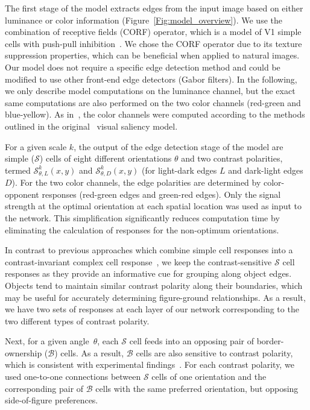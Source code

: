 The first stage of the model
extracts edges from the input image
based on either luminance or color information (Figure~\ref{Fig:model_overview}).
 We use the combination of receptive fields (CORF) operator, which is a
model of V1 simple cells with push-pull
inhibition~\citep{Azzopardi_etal14}. We chose the CORF operator due to its texture suppression properties, which can be beneficial
when applied to natural images. Our model does not require a specific edge detection method and could be modified to use other front-end edge detectors (\eg Gabor filters).
In the following, we only describe model computations on the luminance channel, but the exact same computations are also performed on the two color channels (\ie red-green and blue-yellow). As in~\citet{Russell_etal14}, the color channels were computed according to the methods outlined in the original~\citet{Itti_etal98a} visual saliency model.

For a given scale $k$, the output of the edge detection stage of the model are simple ($\mathcal{S}$) cells of eight different orientations $\theta$ and two contrast polarities, termed $\mathcal{S}^k_{\theta,L}(x,y)$ and $\mathcal{S}^k_{\theta,D}(x,y)$ (\ie for light-dark edges $L$ and dark-light edges $D$). For the two color channels, the edge polarities are determined by color-opponent responses (\eg red-green edges and green-red edges). Only the signal strength at the optimal orientation at each spatial location was used as input to the network. This simplification significantly reduces computation time by eliminating the calculation of responses for the non-optimum orientations.

In contrast to previous approaches which combine simple cell responses into a contrast-invariant complex cell response~\citep{Russell_etal14}, we keep the contrast-sensitive
$\mathcal{S}$
cell responses as they provide an informative cue for grouping along object edges. Objects tend to maintain similar contrast polarity along their boundaries, which may be useful for accurately determining figure-ground relationships. As a result, we have two sets of responses at each layer of our network corresponding to the two different types of contrast polarity.

Next, for a given angle~$\theta$, each 
$\mathcal{S}$
cell
 feeds into an opposing pair of border-ownership ($\mathcal{B}$) cells.
As a result, 
$\mathcal{B}$
cells are also sensitive to contrast polarity, which is consistent with experimental findings~\citep{Zhou_etal00}.
For each contrast polarity, we used one-to-one connections between 
$\mathcal{S}$
cells of one orientation and the corresponding pair of
$\mathcal{B}$
cells with the same preferred orientation, but opposing side-of-figure preferences.

